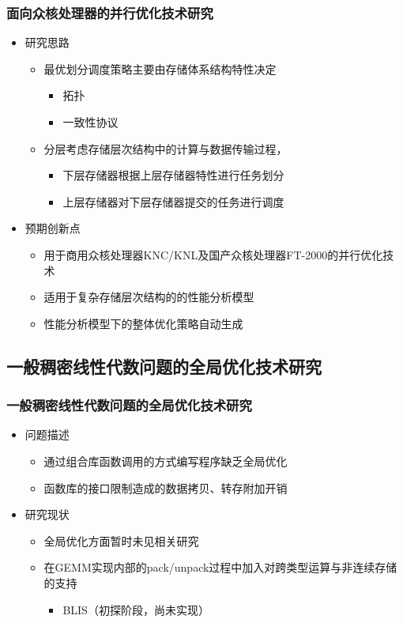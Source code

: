 \documentclass[aspectratio=169]{beamer}
\begin{document}
\begin{frame}
  \frametitle{面向众核处理器的并行优化技术研究}
  \begin{itemize}
  \item 研究思路
    \begin{itemize}
    \item 最优划分调度策略主要由存储体系结构特性决定
      \begin{itemize}
      \item 拓扑
      \item 一致性协议
      \end{itemize}
    \item 分层考虑存储层次结构中的计算与数据传输过程，
      \begin{itemize}
      \item 下层存储器根据上层存储器特性进行任务划分
      \item 上层存储器对下层存储器提交的任务进行调度
      \end{itemize}
    \end{itemize}
  \item 预期创新点
    \begin{itemize}
    \item 用于商用众核处理器KNC/KNL及国产众核处理器FT-2000的并行优化技术
    \item 适用于复杂存储层次结构的的性能分析模型
    \item 性能分析模型下的整体优化策略自动生成
    \end{itemize}
  \end{itemize}
\end{frame}

\subsection[全局优化技术研究]{一般稠密线性代数问题的全局优化技术研究}

\begin{frame}
  \frametitle{一般稠密线性代数问题的全局优化技术研究}
  \begin{itemize}
  \item 问题描述
    \begin{itemize}
    \item 通过组合库函数调用的方式编写程序缺乏全局优化 %
    \item 函数库的接口限制造成的数据拷贝、转存附加开销
    \end{itemize}
  \item 研究现状
    \begin{itemize}
    \item 全局优化方面暂时未见相关研究
    \item 在GEMM实现内部的pack/unpack过程中加入对跨类型运算与非连续存储的支持
      \begin{itemize}
      \item BLIS（初探阶段，尚未实现）
      \end{itemize}
    \end{itemize}
  \end{itemize}
\end{frame}
\end{document}

